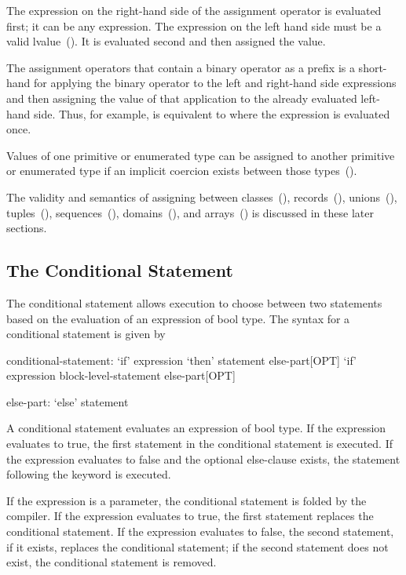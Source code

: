 The expression on the right-hand side of the assignment operator is
evaluated first; it can be any expression.  The expression on the left
hand side must be a valid lvalue~().  It is evaluated
second and then assigned the value.

The assignment operators that contain a binary operator as a prefix is
a short-hand for applying the binary operator to the left and
right-hand side expressions and then assigning the value of that
application to the already evaluated left-hand side.  Thus, for
example,  is equivalent to  where the
expression  is evaluated once.

Values of one primitive or enumerated type can be assigned to another
primitive or enumerated type if an implicit coercion exists between
those types~().

The validity and semantics of assigning between
classes~(), records~(),
unions~(), tuples~(),
sequences~(),
domains~(), and arrays~()
is discussed in these later sections.

\subsection{The Conditional Statement}
\label{The_Conditional_Statement}

The conditional statement allows execution to choose between two
statements based on the evaluation of an expression of bool type. The
syntax for a conditional statement is given by
\begin{syntax}
conditional-statement:
  `if' expression `then' statement else-part[OPT]
  `if' expression block-level-statement else-part[OPT]

else-part:
  `else' statement
\end{syntax}

A conditional statement evaluates an expression of bool type. If the
expression evaluates to true, the first statement in the conditional
statement is executed.  If the expression evaluates to false and the
optional else-clause exists, the statement following the
 keyword is executed.

If the expression is a parameter, the conditional statement is folded
by the compiler. If the expression evaluates to true, the first
statement replaces the conditional statement. If the expression
evaluates to false, the second statement, if it exists, replaces the
conditional statement; if the second statement does not exist, the
conditional statement is removed.

